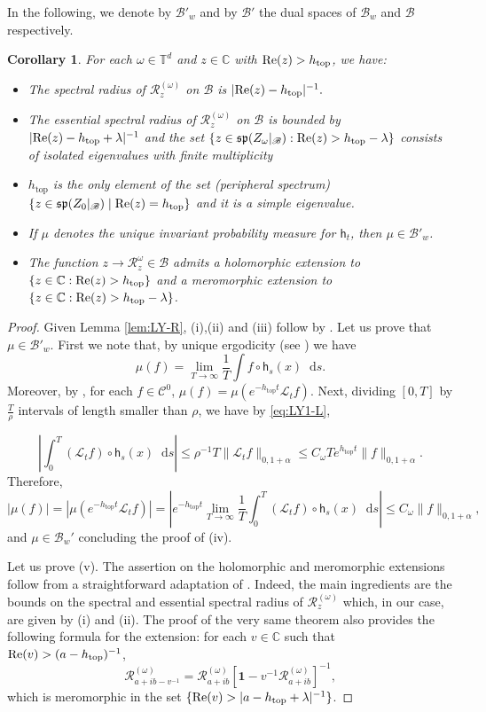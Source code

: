 \documentclass[11pt,letterpaper]{amsart}
\newcommand \cL {{\mathcal L}}
\newcommand \cR {{\mathcal R}}
\def\C{{\mathbb C}}
\newcommand \T {{ \mathbb T}}
\newcommand \cB {{\mathscr B}}
\newcommand \cC {{\mathscr{C}}}
\newcommand{\horo}{\mathsf{h}}
\newcommand*{\diff}{\mathop{}\!\mathrm{d}}
\newcommand \re {{%
\operatorname{Re}
}}
\DeclareMathOperator{\topp}{top}
\newtheorem{corollary}[theorem]{Corollary}
\theoremstyle{definition}
\begin{document}
In the following, we denote by $\cB'_w$ and by $\cB'$ the dual spaces of $\cB_w$ and $\cB$ respectively.

\begin{corollary}\label{prop:spectral}
For each $\omega \in \T^d$ and $z\in \C$ with $\re(z)>h_{\topp}$, we have:
\begin{itemize}
\item[(i)] The spectral radius of $\mathcal{R}^{(\omega)}_z$ on $\cB$ is $|\re(z)-h_{\topp}|^{-1}.$
\item[(ii)] The essential spectral radius of $\mathcal{R}^{(\omega)}_z$ on $\cB$ is bounded by $|\re(z)-h_{\topp}+\lambda |^{-1}$ and the set $\{z\in \mathfrak{sp}(Z_\omega|_{\cB}): \re(z)>h_{\topp}- \lambda\}$ consists of isolated eigenvalues with finite multiplicity
\item[(iii)] $h_{\topp}$ is the only element of the set (peripheral spectrum) $ \{z\in \mathfrak{sp}(Z_0|_{\cB}) \mid \re(z)=h_{\topp}\}$ and it is a simple eigenvalue. 
\item[(iv)] If $\mu$ denotes the unique invariant probability measure for $\horo_t$, then $\mu\in \cB'_w$.
\item[(v)] The function $z\to \cR^{\omega}_z \in \cB$ admits a holomorphic extension to $\{z\in \C : \re(z) > h_{\topp}\}$ and a meromorphic extension to $\{z\in \C : \re(z) > h_{\topp}-\lambda  \}$. 



\end{itemize}
\end{corollary}
\begin{proof}
Given Lemma \ref{lem:LY-R}, (i),(ii) and (iii) follow by \cite[Proposition 2.10, Corollary 2.11]{Liv}. Let us prove that $\mu \in \cB'_w$. First we note that, by unique ergodicity (see \cite{Marcus}) we have
\[
\mu(f)=\lim_{T\to \infty} \frac 1T \int f\circ \horo_s(x)\diff s.
\]
Moreover, by  \cite[Lemma 4.6]{AdBa}, for each $f\in \cC^0$, $\mu(f)=\mu(e^{-h_{\topp}t}\cL_tf)$. Next, dividing $[0,T]$ by $\frac{T}{\rho}$ intervals of length smaller than $\rho$, we have by \eqref{eq:LY1-L},


\[
 \left|\int_0^T (\cL_t f)\circ \horo_s(x)\diff s \right|\le {\rho^{-1}}{T}\|\cL_t f\|_{0,1+\alpha}\le C_\omega T e^{h_{\topp}t} \|f\|_{0,1+\alpha}.
 \]
 Therefore, 
\[
|\mu(f)|= |\mu(e^{-h_{\topp}t}\cL_tf)|=\left| e^{-h_{\topp}t} \lim_{T\to \infty} \frac 1T \int_0^T (\cL_t f)\circ \horo_s(x)\diff s \right|\le  C_\omega \|f\|_{0,1+\alpha},
\]
and $\mu \in \cB_w'$ concluding the proof of (iv).

Let us prove (v). The assertion on the holomorphic and meromorphic extensions follow from a straightforward adaptation of \cite[Theorem 2]{But12}. Indeed, the main ingredients are the bounds on the spectral and essential spectral radius of $\cR^{(\omega)}_z$ which, in our case, are given by (i) and (ii). The proof of the very same theorem also provides the following formula for the extension: for each $v \in \C$ such that $\re(v)>(a-h_{\topp})^{-1}$,
\[
\cR^{(\omega)}_{a+ib-v^{-1}}=\cR^{(\omega)}_{a+ib} [\mathbf{1}-v^{-1}\cR^{(\omega)}_{a+ib}]^{-1},
\]
which is meromorphic in the set $\{\re(v) > |a-h_{\topp}+\lambda |^{-1}\}$.
\end{proof}
\end{document}
